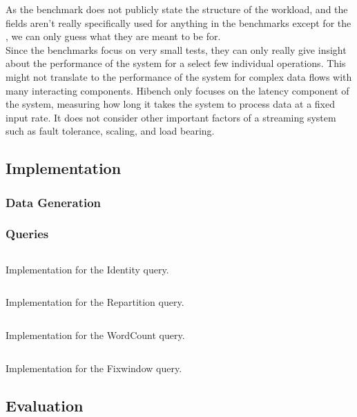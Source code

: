 As the benchmark does not publicly state the structure of the workload, and the fields aren't really specifically used for anything in the benchmarks except for the , we can only guess what they are meant to be for. \\

Since the benchmarks focus on very small tests, they can only really give insight about the performance of the system for a select few individual operations. This might not translate to the performance of the system for complex data flows with many interacting components. Hibench only focuses on the latency component of the system, measuring how long it takes the system to process data at a fixed input rate. It does not consider other important factors of a streaming system such as fault tolerance, scaling, and load bearing.


\subsection{Implementation}
\subsubsection{Data Generation}


\subsubsection{Queries}
\begin{listing}[H]
  \inputminted[firstline=80,lastline=82]{rust}{benchmarks/src/hibench.rs}
  \caption{Implementation for the Identity query.}
  \label{lst:hibench-identity}
\end{listing}

\begin{listing}[H]
  \inputminted[firstline=109,lastline=123]{rust}{benchmarks/src/hibench.rs}
  \caption{Implementation for the Repartition query.}
  \label{lst:hibench-repartition}
\end{listing}

\begin{listing}[H]
  \inputminted[firstline=150,lastline=153]{rust}{benchmarks/src/hibench.rs}
  \caption{Implementation for the WordCount query.}
  \label{lst:hibench-wordcount}
\end{listing}

\begin{listing}[H]
  \inputminted[firstline=180,lastline=194]{rust}{benchmarks/src/hibench.rs}
  \caption{Implementation for the Fixwindow query.}
  \label{lst:hibench-fixwindow}
\end{listing}

\subsection{Evaluation}


